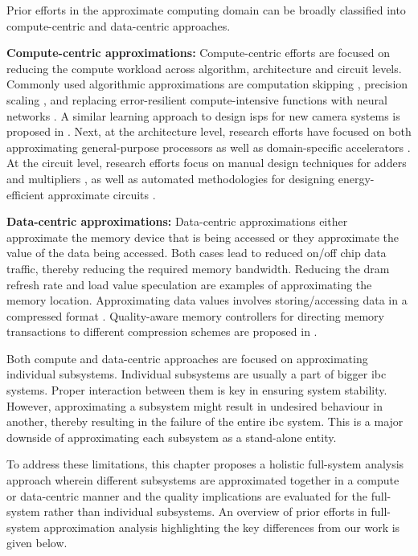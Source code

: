 Prior efforts in the approximate computing domain can be broadly classified into compute-centric and data-centric approaches.

\noindent
\textbf{Compute-centric approximations: }Compute-centric efforts are focused on reducing the compute workload across algorithm, architecture and circuit levels. Commonly used algorithmic approximations are computation skipping \cite{comp_skip}, precision scaling \cite{precision_scaling}, and replacing error-resilient compute-intensive functions with neural networks \cite{nn_invoke}. A similar learning approach to design \glspl{isp} for new camera systems is proposed in \cite{learning_isp}. Next, at the architecture level, research efforts have focused on both approximating general-purpose processors\cite{ProACt} as well as domain-specific accelerators \cite{sde}. At the circuit level, research efforts focus on manual design techniques for adders and multipliers \cite{approx_maual}, as well as automated methodologies for designing energy-efficient approximate circuits \cite{sde2}.

\noindent
\textbf{Data-centric approximations: }Data-centric approximations either approximate the memory device that is being accessed or they approximate the value of the data being accessed. Both cases lead to reduced on/off chip data traffic, thereby reducing the required memory bandwidth. Reducing the \gls{dram} refresh rate \cite{dram} and load value speculation \cite{load_speculate} are examples of approximating the memory location. Approximating data values involves storing/accessing data in a compressed format \cite{data_subsetting}. Quality-aware memory controllers for directing memory transactions to different compression schemes are proposed in \cite{mem_control2020}.

\par Both compute and data-centric approaches are focused on approximating individual subsystems. Individual subsystems are usually a part of bigger \gls{ibc} systems. Proper interaction between them is key in ensuring system stability. However, approximating a subsystem might result in undesired behaviour in another, thereby resulting in the failure of the entire \gls{ibc} system.
This is a major downside of approximating each subsystem as a stand-alone entity.

\par To address these limitations, this chapter proposes a holistic full-system analysis approach wherein different subsystems are approximated together in a compute or data-centric manner and the quality implications are evaluated for the full-system rather than individual subsystems. An overview of prior efforts in full-system approximation analysis highlighting the key differences from our work is given below. 

